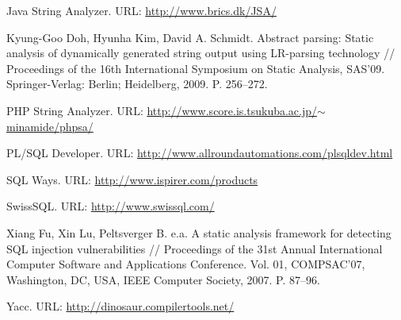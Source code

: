 \documentclass{llncs}
\begin{document}
\begin{thebibliography}{}
Java String Analyzer. URL: \href{http://www.brics.dk/JSA/}{http://www.brics.dk/JSA/}

Kyung-Goo Doh, Hyunha Kim, David A. Schmidt. Abstract parsing: Static analysis of dynamically generated string output using LR-parsing technology // Proceedings of the 16th International Symposium on Static Analysis, SAS’09. Springer-Verlag: Berlin; Heidelberg, 2009. P. 256–272.

PHP String Analyzer. URL: \href{http://www.score.is.tsukuba.ac.jp/~minamide/phpsa/}{http://www.score.is.tsukuba.ac.jp/$\sim$minamide/phpsa/}

PL/SQL Developer. URL: \href{http://www.allroundautomations.com/plsqldev.html}{http://www.allroundautomations.com/plsqldev.html}

SQL Ways. URL: \href{http://www.ispirer.com/products}{http://www.ispirer.com/products}

SwissSQL. URL: \href{http://www.swissql.com/}{http://www.swissql.com/}

Xiang Fu, Xin Lu, Peltsverger B. e.a. A static analysis framework for detecting SQL injection vulnerabilities // Proceedings of the 31st Annual International Computer Software and Applications Conference. Vol. 01, COMPSAC’07, Washington, DC, USA, IEEE Computer Society, 2007. P. 87–96.

Yacc. URL: \href{http://dinosaur.compilertools.net/}{http://dinosaur.compilertools.net/}

\end{thebibliography}%
%
\end{document}
